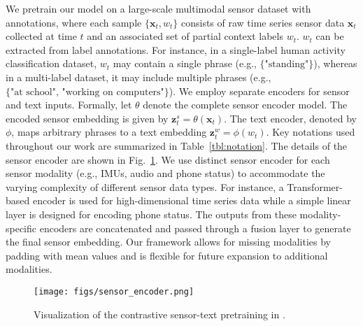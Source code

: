 We pretrain our model on a large-scale multimodal sensor dataset with annotations, where each sample $\{\mathbf{x}_t, w_t\}$ consists of raw time series sensor data $\mathbf{x}_t$ collected at time $t$ and an associated set of partial context labels $w_t$. $w_t$ can be extracted from label annotations. For instance, in a single-label human activity classification dataset,  $w_t$ may contain a single phrase (e.g., $\{\textrm{"standing"}\}$), whereas in a multi-label dataset, it may include multiple phrases (e.g., $\{ \textrm{"at school", "working on computers"}\}$).
We employ separate encoders for sensor and text inputs. 
Formally, let $\theta$ denote the complete sensor encoder model. The encoded sensor embedding is given by $\mathbf{z}^s_t = \theta(\mathbf{x}_t)$.
The text encoder, denoted by $\phi$, maps arbitrary phrases to a text embedding $\mathbf{z}^w_t = \phi(w_t)$.
Key notations used throughout our work are summarized in Table~\ref{tbl:notation}.
%
The details of the sensor encoder are shown in Fig.~\ref{fig:sensor_encoder}. We use distinct sensor encoder for each sensor modality (e.g., IMUs, audio and phone status) to accommodate the varying complexity of different sensor data types. For instance, a Transformer-based encoder is used for high-dimensional time series data while a simple linear layer is designed for encoding phone status. The outputs from these modality-specific encoders are concatenated and passed through a fusion layer to generate the final sensor embedding. Our framework allows for missing modalities by padding with mean values and is flexible for future expansion to additional modalities.

\begin{figure}[t]
\begin{center}
\texttt{[image: figs/sensor\_encoder.png]} 
\vspace{-4mm}
\caption{Visualization of the contrastive sensor-text pretraining in \Method.}
\label{fig:sensor_encoder}
\end{center}
\vspace{-6mm}
\end{figure}


